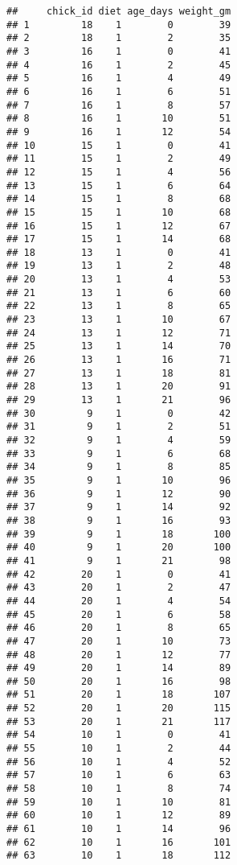 \documentclass[
]{article}
\begin{document}
\begin{verbatim}
##     chick_id diet age_days weight_gm
## 1         18    1        0        39
## 2         18    1        2        35
## 3         16    1        0        41
## 4         16    1        2        45
## 5         16    1        4        49
## 6         16    1        6        51
## 7         16    1        8        57
## 8         16    1       10        51
## 9         16    1       12        54
## 10        15    1        0        41
## 11        15    1        2        49
## 12        15    1        4        56
## 13        15    1        6        64
## 14        15    1        8        68
## 15        15    1       10        68
## 16        15    1       12        67
## 17        15    1       14        68
## 18        13    1        0        41
## 19        13    1        2        48
## 20        13    1        4        53
## 21        13    1        6        60
## 22        13    1        8        65
## 23        13    1       10        67
## 24        13    1       12        71
## 25        13    1       14        70
## 26        13    1       16        71
## 27        13    1       18        81
## 28        13    1       20        91
## 29        13    1       21        96
## 30         9    1        0        42
## 31         9    1        2        51
## 32         9    1        4        59
## 33         9    1        6        68
## 34         9    1        8        85
## 35         9    1       10        96
## 36         9    1       12        90
## 37         9    1       14        92
## 38         9    1       16        93
## 39         9    1       18       100
## 40         9    1       20       100
## 41         9    1       21        98
## 42        20    1        0        41
## 43        20    1        2        47
## 44        20    1        4        54
## 45        20    1        6        58
## 46        20    1        8        65
## 47        20    1       10        73
## 48        20    1       12        77
## 49        20    1       14        89
## 50        20    1       16        98
## 51        20    1       18       107
## 52        20    1       20       115
## 53        20    1       21       117
## 54        10    1        0        41
## 55        10    1        2        44
## 56        10    1        4        52
## 57        10    1        6        63
## 58        10    1        8        74
## 59        10    1       10        81
## 60        10    1       12        89
## 61        10    1       14        96
## 62        10    1       16       101
## 63        10    1       18       112

\end{verbatim}
\end{document}
